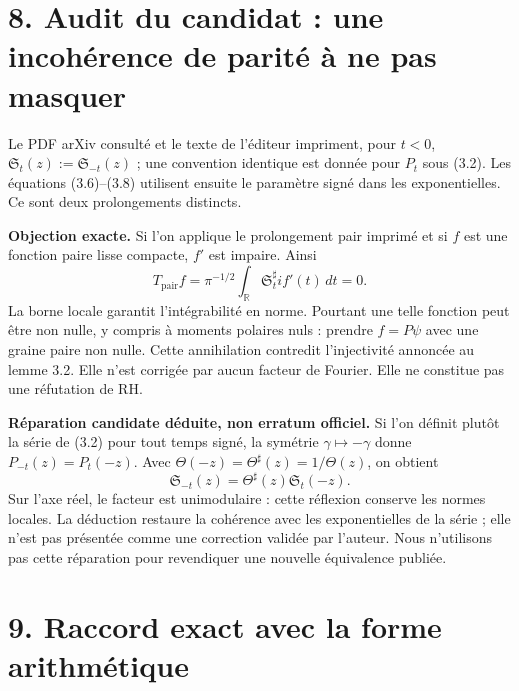 \documentclass[
  11pt,
]{article}
\begin{document}
\hypertarget{audit-du-candidat-une-incohuxe9rence-de-parituxe9-uxe0-ne-pas-masquer}{%
\section{8. Audit du candidat : une incohérence de parité à ne pas
masquer}\label{audit-du-candidat-une-incohuxe9rence-de-parituxe9-uxe0-ne-pas-masquer}}

Le PDF arXiv consulté et le texte de l'éditeur impriment, pour \(t<0\),
\(\mathfrak S_t(z):=\mathfrak S_{-t}(z)\) ; une convention identique est
donnée pour \(P_t\) sous (3.2). Les équations (3.6)--(3.8) utilisent
ensuite le paramètre signé dans les exponentielles. Ce sont deux
prolongements distincts.

\textbf{Objection exacte.} Si l'on applique le prolongement pair imprimé
et si \(f\) est une fonction paire lisse compacte, \(f'\) est impaire.
Ainsi \[
T_{\mathrm{pair}}f=\pi^{-1/2}\int_{\mathbb R}\mathfrak S_t^\sharp if'(t)\,dt=0.
\] La borne locale garantit l'intégrabilité en norme. Pourtant une telle
fonction peut être non nulle, y compris à moments polaires nuls :
prendre \(f=P\psi\) avec une graine paire non nulle. Cette annihilation
contredit l'injectivité annoncée au lemme 3.2. Elle n'est corrigée par
aucun facteur de Fourier. Elle ne constitue pas une réfutation de RH.

\textbf{Réparation candidate déduite, non erratum officiel.} Si l'on
définit plutôt la série de (3.2) pour tout temps signé, la symétrie
\(\gamma\mapsto-\gamma\) donne \(P_{-t}(z)=P_t(-z)\). Avec
\(\Theta(-z)=\Theta^\sharp(z)=1/\Theta(z)\), on obtient \[
\mathfrak S_{-t}(z)=\Theta^\sharp(z)\mathfrak S_t(-z).
\] Sur l'axe réel, le facteur est unimodulaire : cette réflexion
conserve les normes locales. La déduction restaure la cohérence avec les
exponentielles de la série ; elle n'est pas présentée comme une
correction validée par l'auteur. Nous n'utilisons pas cette réparation
pour revendiquer une nouvelle équivalence publiée.

\hypertarget{raccord-exact-avec-la-forme-arithmuxe9tique}{%
\section{9. Raccord exact avec la forme
arithmétique}\label{raccord-exact-avec-la-forme-arithmuxe9tique}}
\end{document}
